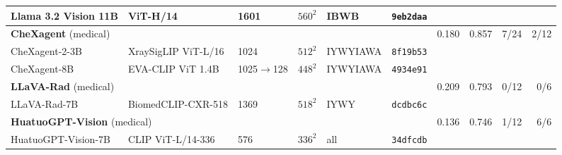 \begin{table}[htbp]
{\begin{tabular}{llllll@{\hspace{8pt}}rrrr}
\quad Llama 3.2 Vision 11B & ViT-H/14 & 1601 & $560^2$ & IBWB & \texttt{9eb2daa} & & & & \\
\midrule
\multicolumn{6}{l}{\textbf{CheXagent} (medical)~\citep{chen2024chexagent}} & 0.180 & 0.857 & \cellcolor{cfTerra3}7/24 & \cellcolor{cfTerra2}2/12 \\
\quad CheXagent-2-3B & XraySigLIP ViT-L/16 & 1024 & $512^2$ & IYWYIAWA & \texttt{8f19b53} & & & & \\
\quad CheXagent-8B & EVA-CLIP ViT 1.4B & 1025$\to$128 & $448^2$ & IYWYIAWA & \texttt{4934e91} & & & & \\
\midrule
\multicolumn{6}{l}{\textbf{LLaVA-Rad} (medical)~\citep{zambranochaves2025llavarad}} & 0.209 & 0.793 & \cellcolor{cfTerra1}0/12 & \cellcolor{cfTerra1}0/6 \\
\quad LLaVA-Rad-7B & BiomedCLIP-CXR-518 & 1369 & $518^2$ & IYWY & \texttt{dcdbc6c} & & & & \\
\midrule
\multicolumn{6}{l}{\textbf{HuatuoGPT-Vision} (medical)~\citep{chen2024huatuogptvision}} & 0.136 & 0.746 & \cellcolor{cfTerra2}1/12 & \cellcolor{cfTerra4}6/6 \\
\quad HuatuoGPT-Vision-7B & CLIP ViT-L/14-336 & 576 & $336^2$ & all & \texttt{34dfcdb} & & & & \\
\bottomrule
\end{tabular}}
\end{table}
